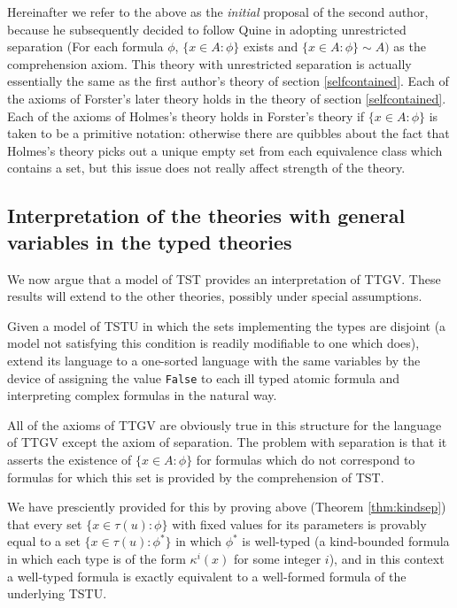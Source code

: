 \documentclass[12pt]{article}
\renewcommand{\smallpara}[1]{\begin{footnotesize}\begin{spacing}{0.8}\begin{quote} #1  \end{quote}\end{spacing}\end{footnotesize}}
\begin{document}
Hereinafter we refer to the above 
as the {\sl initial} proposal of the second author, because he subsequently decided to follow Quine in adopting unrestricted separation (For each formula $\phi$, $\{x \in A:\phi\}$ exists and $\{x \in A:\phi\}\sim A)$ as the comprehension axiom.  This theory with unrestricted separation is actually essentially the same as the first author's theory of section \ref{selfcontained}.  Each of the axioms of Forster's later theory holds in the theory of section \ref{selfcontained}.  Each of the axioms of Holmes's theory holds in Forster's theory if $\{x \in A:\phi\}$ is taken to be a primitive notation:  otherwise there are quibbles about the fact that Holmes's theory picks out a unique empty set from each equivalence class which contains a set, but this issue does not really affect strength of the theory.   



\subsection{Interpretation of the theories with general variables in the typed theories}

We now argue that a model of TST provides an interpretation of TTGV.  These results will extend
to the other theories, possibly under special assumptions.

Given a model of TSTU in which the sets implementing the types are disjoint (a model not satisfying this condition is readily modifiable to one which does), extend its language to a one-sorted language with the same variables
by the device of assigning the value {\tt False} to each ill typed atomic formula and interpreting complex formulas in the natural way.

All of the axioms of TTGV are obviously true in this structure for the language of TTGV except the axiom of separation.  The problem with separation is that it asserts the existence of $\{x \in A:\phi\}$ for formulas
which do not correspond to formulas for which this set is provided by the comprehension of TST.

We have presciently provided for this by proving above (Theorem \ref{thm:kindsep}) that every set $\{x \in \tau(u):\phi\}$ with fixed values for its parameters is provably equal to a set $\{x \in \tau(u):\phi^*\}$ in which $\phi^*$ is well-typed (a kind-bounded formula in which each type is of the form $\kappa^i(x)$ for some integer $i$), and in this context a well-typed formula is exactly equivalent to a well-formed formula of the underlying TSTU. 
\end{document}
